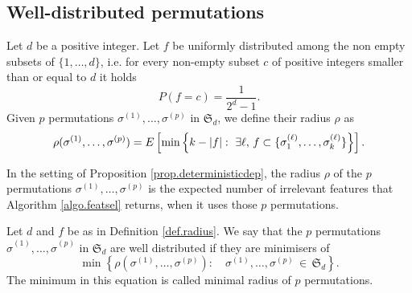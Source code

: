 \subsection{Well-distributed permutations}

\begin{defi}[radius]
	\label{def.radius}
	Let $d$ be a positive integer.
	Let $f$ be uniformly distributed among 
	the non empty subsets of $\lbrace 1, \dots, d\rbrace$, 
	i.e.
	for every non-empty subset $c$ of positive integers smaller than or equal to $d$
	it holds
	$$
	P(f = c) = \frac{1}{2^{d} - 1}.
	$$
	Given $p$ permutations
	$
	\sigma^{(1)}, \dots, \sigma^{(p)}
	$
	in 
	$\mathfrak{S}_d$,
	we define their radius $\rho$ as
	\begin{equation}
		\rho(
		\sigma^{(1)}, \dots, \sigma^{(p)}
		)
		=
		E\left[
			\min
			\left\lbrace
			k - \left\lvert {f} \right\rvert:\,\,
			\exists \ell, \,
			f \subset
			\lbrace
			\sigma^{(\ell)}_1, \dots, \sigma^{(\ell)}_k
			\rbrace
			\right\rbrace
			\right].
	\end{equation}
\end{defi}

\begin{remark}
	In the setting of Proposition \ref{prop.deterministicdep},
	the radius $\rho$ of the $p$ permutations
	$
		\sigma^{(1)}, \dots, \sigma^{(p)}
	$
	is the expected number of irrelevant features that Algorithm \ref{algo.featsel}
	returns, when it uses those $p$ permutations. 
\end{remark}

\begin{defi}
	\label{def.welldistributedness}
	Let $d$ and $f$ be as in Definition \ref{def.radius}.
	We say that the $p$ permutations
	$
	\hat{\sigma}^{(1)}, \dots, \hat{\sigma}^{(p)}
	$
	in 
	$\mathfrak{S}_d$
	are well distributed if
	they are minimisers of
	\begin{equation}
		\min
		\left\lbrace
		\rho(
		\sigma^{(1)}, \dots, \sigma^{(p)}
		):
		\quad
		\sigma^{(1)}, \dots, \sigma^{(p)} 
		\,
		\in
		\,
		\mathfrak{S}_d
		\right\rbrace.
	\end{equation}
	The minimum in this equation is called minimal radius of $p$ permutations.
\end{defi}


